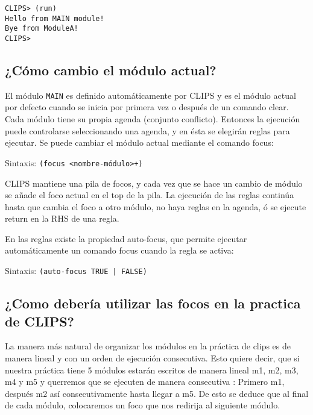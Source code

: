 \documentclass[11pt,svgnames]{scrbook}
\begin{document}
\begin{verbatim}
CLIPS> (run)
Hello from MAIN module!
Bye from ModuleA!
CLIPS>
\end{verbatim}




\subsection{¿Cómo cambio el módulo actual?}

El módulo \texttt{MAIN} es definido automáticamente por CLIPS y es el módulo actual por defecto
cuando se inicia por primera vez o después de un comando clear. Cada módulo tiene su propia agenda
(conjunto conflicto). Entonces la ejecución puede controlarse seleccionando una agenda, y en ésta se
elegirán reglas para ejecutar. Se puede cambiar el módulo actual mediante el comando focus:
\medskip

Sintaxis: \texttt{(focus <nombre-módulo>+)}
\medskip

CLIPS mantiene una pila de focos, y cada vez que se hace un cambio de módulo se añade el foco actual en el top de la pila. La ejecución de las reglas continúa hasta que cambia el foco a otro módulo, no haya reglas en la agenda, ó se ejecute return en la RHS de una regla.

En las reglas existe la propiedad auto-focus, que permite ejecutar automáticamente un comando focus cuando la regla se activa:
\medskip

Sintaxis: \texttt{(auto-focus TRUE | FALSE)}

\subsection{¿Como debería utilizar las focos en la practica de CLIPS?}

La manera más natural de organizar los módulos en la práctica de clips es de
manera lineal y con un  orden de ejecución consecutiva. Esto quiere decir, que
si nuestra práctica tiene 5 módulos estarán escritos de manera lineal m1, m2,
m3, m4 y m5 y querremos que se ejecuten de manera consecutiva : Primero m1,
después m2 así consecutivamente hasta llegar a m5.
De esto se deduce que al final de cada módulo, colocaremos un foco que nos
redirija al siguiente módulo. 
\end{document}
